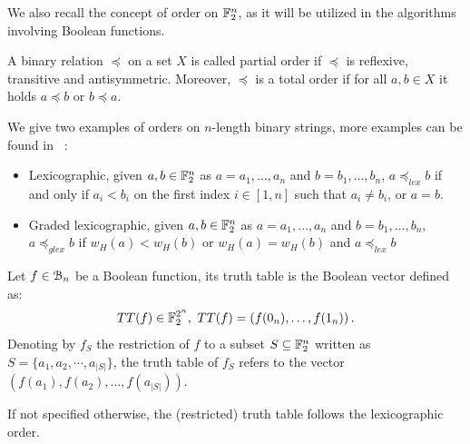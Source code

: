 \documentclass[11pt]{llncs}
\begin{document}
We also recall the concept of order on $\mathbb{F}_2^n$, as it will be utilized in the algorithms involving Boolean functions.



\begin{definition}[Order]\label{def:order}
	A binary relation $\preceq$	on a set $X$ is called partial order if $\preceq$ is reflexive, transitive and antisymmetric. 
	Moreover, $\preceq$ is a total order if for all $a,b\in X$ it holds $a\preceq b$ or $b \preceq a$.
	
\end{definition}

We give two examples of orders on $n$-length binary strings, more examples can be found in \eg~\cite{FUN:SteWil12}:
\begin{itemize}
	\item Lexicographic, given $a,b \in \mathbb{F}_2^n$ as $a=a_1,\ldots, a_n$ and $b=b_1,\ldots,b_n$, $a\preceq_{lex} b$ if and only if  $a_i<b_i$ on the first index $i\in [1,n]$ such that $a_i\ne b_i$, or $a=b$.
	\item Graded lexicographic, given $a,b \in \mathbb{F}_2^n$ as $a=a_1,\ldots, a_n$ and $b=b_1,\ldots,b_n$, $a\preceq_{glex} b$ if $w_H(a) < w_H(b)$ or $w_H(a) = w_H(b)$ and $ a\preceq_{lex}  b$
\end{itemize}




\begin{definition}\label{def:trutthTable}
	Let $f\in \mathcal{B}_{n}$ be a Boolean function, its truth table is the Boolean vector defined as:
\begin{align*}
TT(f) \in \mathbb{F}_2^{2^n},\  TT(f) = \left(f(0_n), \dots, f(1_n)\right).
\end{align*}	
	Denoting by $f_S$ the restriction of $f$ to a subset $S\subseteq \mathbb{F}_2^n$ written as $S = \{a_1, a_2, \cdots, a_{|S|}\}$, the truth table of $f_S$ refers to the vector $\left(f(a_1), f(a_2), \dots, f(a_{|S|})\right)$.

If not specified otherwise, the (restricted) truth table follows the lexicographic order.	
		
\end{definition}

\end{document}
